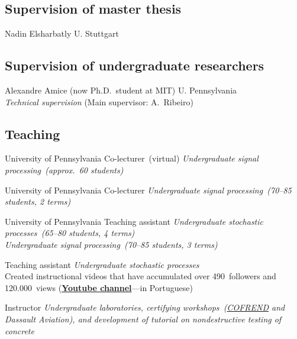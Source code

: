 \documentclass{cvlfoc}
\begin{document}

\subsection*{Supervision of master thesis}

\begin{entrydate}
		{Nadin Elsharbatly \hfill U. Stuttgart}
\end{entrydate}


\subsection*{Supervision of undergraduate researchers}

\begin{entrydate}
		{Alexandre Amice {\small (now Ph.D.\ student at MIT)}
		\hfill U. Pennsylvania\\
		\emph{Technical supervision} \hfill(Main supervisor: A.\ Ribeiro)}
\end{entrydate}


\subsection*{Teaching}

\begin{entrydate}
		{University of Pennsylvania}
		{Co-lecturer~(virtual)}
		{\emph{Undergraduate signal processing~(approx.\ 60 students)}}

		{University of Pennsylvania}
		{Co-lecturer}
		{\emph{Undergraduate signal processing~(70--85 students, 2 terms)}}

		{University of Pennsylvania}
		{Teaching assistant}
		{\emph{Undergraduate stochastic processes~(65--80 students, 4 terms)\\
		Undergraduate signal processing~(70--85 students, 3 terms)}}

		{Teaching assistant}
		{\emph{Undergraduate stochastic processes}\\
		Created instructional videos that have accumulated over
		490~followers and\\120.000~views
		(\href{https://www.youtube.com/@videos-aleatorios}{\textbf{Youtube channel}}---in Portuguese)}

		{Instructor}
		{\emph{Undergraduate laboratories, certifying workshops~(\href{https://www.cofrend.com}{\emph{COFREND}}
		and \emph{Dassault Aviation}), and development of tutorial on nondestructive
		testing of concrete}}
\end{entrydate}
\end{document}
